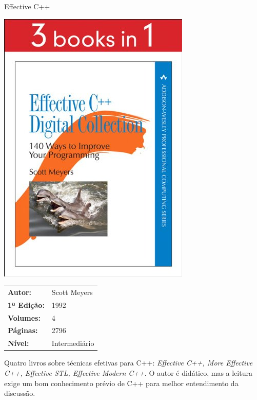 \begin{frame}[fragile]{Effective C++}

    \begin{minipage}{0.4\textwidth}
        \includegraphics[scale=0.25]{scott.jpg}
    \end{minipage}
    \begin{minipage}{0.5\textwidth}
        \begin{small}
            \begin{tabularx}{0.95\textwidth}{lX}
                \textbf{Autor:} & Scott Meyers \\
                \textbf{1ª Edição:} & 1992 \\
                \textbf{Volumes:} & 4 \\
                \textbf{Páginas:} & 2796 \\
                \textbf{Nível:} & Intermediário \\
            \end{tabularx}
        \end{small}
    \end{minipage}

    \vspace{0.2in} 

    Quatro livros sobre técnicas efetivas para C++: \textit{Effective C++, More Effective C++,
    Effective STL, Effective Modern C++}. O autor é didático, mas a leitura exige um bom
    conhecimento prévio de C++ para melhor entendimento da discussão.

\end{frame}

